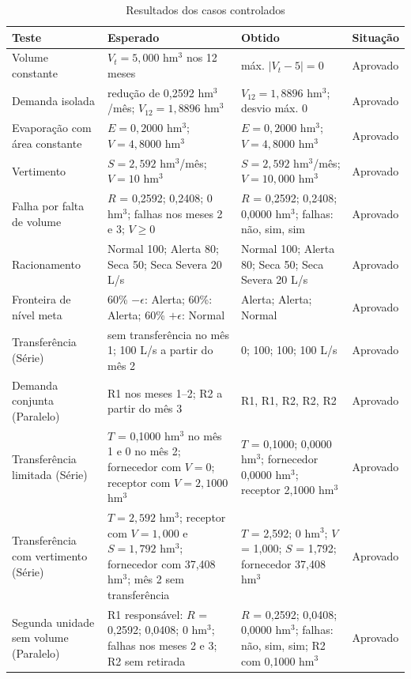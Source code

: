 \begin{table}[H]
    \captionsetup{width=15cm}
    \caption{Resultados dos casos controlados}
    \label{tab:casos-resultados}
    \centering
    \scriptsize
    \begin{tabular}{p{2.8cm}p{4.3cm}p{4.6cm}p{1.4cm}}
        \toprule
        Teste & Esperado & Obtido & Situação \\
        \midrule
        Volume constante & $V_t = 5{,}000$ hm$^3$ nos 12 meses & máx. $|V_t-5| = 0$ & Aprovado \\
        Demanda isolada & redução de 0,2592 hm$^3$/mês; $V_{12}=1{,}8896$ hm$^3$ & $V_{12}=1{,}8896$ hm$^3$; desvio máx. 0 & Aprovado \\
        Evaporação com área constante & $E=0{,}2000$ hm$^3$; $V=4{,}8000$ hm$^3$ & $E=0{,}2000$ hm$^3$; $V=4{,}8000$ hm$^3$ & Aprovado \\
        Vertimento & $S=2{,}592$ hm$^3$/mês; $V=10$ hm$^3$ & $S=2{,}592$ hm$^3$/mês; $V=10{,}000$ hm$^3$ & Aprovado \\
        Falha por falta de volume & $R$ = 0,2592; 0,2408; 0 hm$^3$; falhas nos meses 2 e 3; $V\geq0$ & $R$ = 0,2592; 0,2408; 0,0000 hm$^3$; falhas: não, sim, sim & Aprovado \\
        Racionamento & Normal 100; Alerta 80; Seca 50; Seca Severa 20 L/s & Normal 100; Alerta 80; Seca 50; Seca Severa 20 L/s & Aprovado \\
        Fronteira de nível meta & 60\% $-\epsilon$: Alerta; 60\%: Alerta; 60\% $+\epsilon$: Normal & Alerta; Alerta; Normal & Aprovado \\
        Transferência (Série) & sem transferência no mês 1; 100 L/s a partir do mês 2 & 0; 100; 100; 100 L/s & Aprovado \\
        Demanda conjunta (Paralelo) & R1 nos meses 1--2; R2 a partir do mês 3 & R1, R1, R2, R2, R2 & Aprovado \\
        Transferência limitada (Série) & $T$ = 0,1000 hm$^3$ no mês 1 e 0 no mês 2; fornecedor com $V=0$; receptor com $V=2{,}1000$ hm$^3$ & $T$ = 0,1000; 0,0000 hm$^3$; fornecedor 0,0000 hm$^3$; receptor 2,1000 hm$^3$ & Aprovado \\
        Transferência com vertimento (Série) & $T=2{,}592$ hm$^3$; receptor com $V=1{,}000$ e $S=1{,}792$ hm$^3$; fornecedor com 37,408 hm$^3$; mês 2 sem transferência & $T$ = 2,592; 0 hm$^3$; $V$ = 1,000; $S$ = 1,792; fornecedor 37,408 hm$^3$ & Aprovado \\
        Segunda unidade sem volume (Paralelo) & R1 responsável: $R$ = 0,2592; 0,0408; 0 hm$^3$; falhas nos meses 2 e 3; R2 sem retirada & $R$ = 0,2592; 0,0408; 0,0000 hm$^3$; falhas: não, sim, sim; R2 com 0,1000 hm$^3$ & Aprovado \\
        \bottomrule
    \end{tabular}
\end{table}

